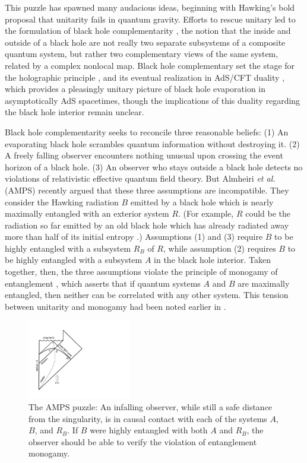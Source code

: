 \documentclass[11pt]{article}
\begin{document}
This puzzle has spawned many audacious ideas, beginning with Hawking's bold proposal \cite{hawking2} that unitarity fails in quantum gravity. Efforts to rescue unitary led to the formulation of black hole complementarity \cite{complement1,complement2}, the notion that the inside and outside of a black hole are not really two separate subsystems of a composite quantum system, but rather two complementary views of the same system, related by a complex nonlocal map. Black hole complementary set the stage for the holographic principle \cite{holographic1,holographic2}, and its eventual realization in AdS/CFT duality \cite{ads-cft}, which provides a pleasingly unitary picture of black hole evaporation in asymptotically AdS spacetimes, though the implications of this duality regarding the black hole interior remain unclear.

Black hole complementarity seeks to reconcile three reasonable beliefs: (1) An evaporating black hole scrambles quantum information without destroying it. (2) A freely falling observer encounters nothing unusual upon crossing the event horizon of a black hole. (3) An observer who stays outside a black hole detects no violations of relativistic effective quantum field theory. But Almheiri {\em et al.} (AMPS) recently argued \cite{amps} that these three assumptions are incompatible. They consider the Hawking radiation $B$ emitted by a black hole which is nearly maximally entangled with an exterior system $R$. (For example, $R$ could be the radiation so far emitted by an old black hole which has already radiated away more than half of its initial entropy \cite{page}.) Assumptions (1) and (3) require $B$ to be highly entangled with a subsystem $R_B$ of $R$, while assumption (2) requires $B$ to be highly entangled with a subsystem $A$ in the black hole interior. Taken together, then, the three assumptions violate the principle of monogamy of entanglement \cite{terhal,koashi}, which asserts that if quantum systems $A$ and $B$ are maximally entangled, then neither can be correlated with any other system. This tension between unitarity and monogamy had been noted earlier in \cite{mathur,braunstein}.


\begin{figure}[t]
\begin{center}
\includegraphics[width=0.4\textwidth]{amps.pdf}
\end{center}
\caption{The AMPS puzzle: An infalling observer, while still a safe distance from the singularity, is in causal contact with each of the systems $A$, $B$, and $R_B$. If $B$ were highly entangled with both $A$ and $R_B$, the observer should be able to verify the violation of entanglement monogamy.}
\label{fig:amps}
\end{figure}
\end{document}
